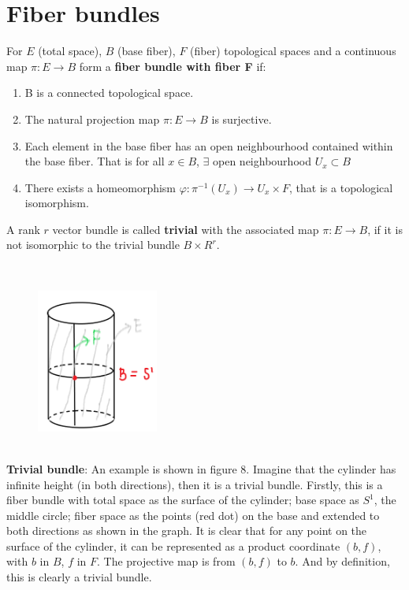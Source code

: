 \documentclass[12pt,twoside]{article}
\begin{document}
\section{Fiber bundles}

\begin{definition}
For $E$ (total space), $B$ (base fiber), $F$ (fiber) topological spaces and a continuous map $\pi : E \rightarrow B$ form a \textbf{fiber bundle with fiber F} \cite{fiber bundle} if:
\begin{enumerate}
    \item B is a connected topological space.
    \item The natural projection map $\pi: E \rightarrow B$ is surjective.
    \item Each element in the base fiber has an open neighbourhood contained within the base fiber. That is for all $x \in B$, $\exists$ open neighbourhood $U_{x} \subset B$ \cite{Lawn}    
    \item There exists a homeomorphism $\varphi: \pi^{-1}(U_{x})\rightarrow U_{x}\times F$, that is a topological isomorphism.
\end{enumerate}
\end{definition}

\begin{remark}
A rank $r$ vector bundle is called \textbf{trivial} with the associated map $\pi: E \rightarrow B$, if it is not isomorphic to the trivial bundle $B\times R^{r}$. 
\end{remark}
\\
\begin{figure}[tb]
\centering
\includegraphics[width=40mm]{fiber bundle.png} 
\caption{ \label{overflow}}
\end{figure}
\\
\textbf{Trivial bundle}: An example is shown in figure 8. Imagine that the cylinder has infinite height (in both directions), then it is a trivial bundle. Firstly, this is a fiber bundle with total space as the surface of the cylinder; base space as $S^{1}$, the middle circle; fiber space as the points (red dot) on the base and extended to both directions as shown in the graph. It is clear that for any point on the surface of the cylinder, it can be represented as a product coordinate $(b,f)$, with $b$ in $B$, $f$ in $F$. The projective map is from $(b,f)$ to $b$. And by definition, this is clearly a trivial bundle.
\end{document}
